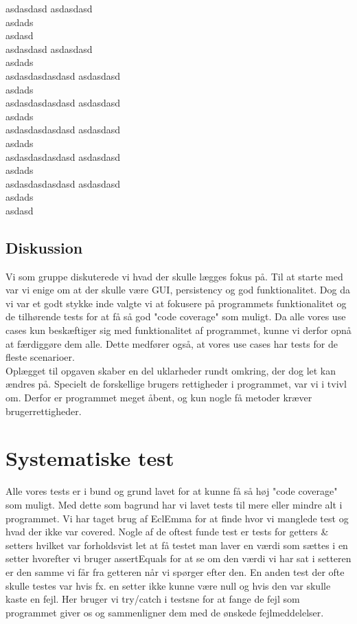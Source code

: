 \documentclass[a4paper,12pt]{article}
\begin{document}
asdasdasd
asdasdasd\\asdads\\asdasd\\
asdasdasd
asdasdasd\\asdads\\asdasdasdasdasd
asdasdasd\\asdads\\asdasdasdasdasd
asdasdasd\\asdads\\asdasdasdasdasd
asdasdasd\\asdads\\asdasdasdasdasd
asdasdasd\\asdads\\asdasdasdasdasd
asdasdasd\\asdads\\asdasd
\newpage
\subsection{Diskussion}
Vi som gruppe diskuterede vi hvad der skulle lægges fokus på. Til at starte med var vi enige om at der skulle være GUI, persistency og god funktionalitet. Dog da vi var et godt stykke inde valgte vi at fokusere på programmets funktionalitet og de tilhørende tests for at få så god "code coverage" som muligt. Da alle vores use cases kun beskæftiger sig med funktionalitet af programmet, kunne vi derfor opnå at færdiggøre dem alle. Dette medfører også, at vores use cases har tests for de fleste scenarioer.\\
Oplægget til opgaven skaber en del uklarheder rundt omkring, der dog let kan ændres på. Specielt de forskellige brugers rettigheder i programmet, var vi i tvivl om. Derfor er programmet meget åbent, og kun nogle få metoder kræver brugerrettigheder. 
\section{Systematiske test}
Alle vores tests er i bund og grund lavet for at kunne få så høj "code coverage" som muligt. Med dette som bagrund har vi lavet tests til mere eller mindre alt i programmet. Vi har taget brug af EclEmma for at finde hvor vi manglede test og hvad der ikke var covered. Nogle af de oftest funde test er tests for getters \& setters hvilket var forholdsvist let at få testet man laver en værdi som sættes i en setter hvorefter vi bruger assertEquals for at se om den værdi vi har sat i setteren er den samme vi får fra getteren når vi spørger efter den. En anden test der ofte skulle testes var hvis fx. en setter ikke kunne være null og hvis den var skulle kaste en fejl. Her bruger vi try/catch i testsne for at fange de fejl som programmet giver os og sammenligner dem med de ønskede fejlmeddelelser.
\end{document}

